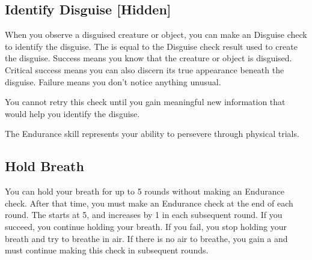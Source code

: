     \subsection{Identify Disguise [Hidden]}
        When you observe a disguised creature or object, you can make an Disguise check to identify the disguise.
        The  is equal to the Disguise check result used to create the disguise.
        Success means you know that the creature or object is disguised.
        Critical success means you can also discern its true appearance beneath the disguise.
        Failure means you don't notice anything unusual.

        You cannot retry this check until you gain meaningful new information that would help you identify the disguise.

\newpage
{}
    The Endurance skill represents your ability to persevere through physical trials.


    \subsection{Hold Breath}\label{Hold Breath}
        You can hold your breath for up to 5 rounds without making an Endurance check.
        After that time, you must make an Endurance check at the end of each round.
        The  starts at 5, and increases by 1 in each subsequent round.
        If you succeed, you continue holding your breath.
        If you fail, you stop holding your breath and try to breathe in air.
        If there is no air to breathe, you gain a  and must continue making this check in subsequent rounds.

